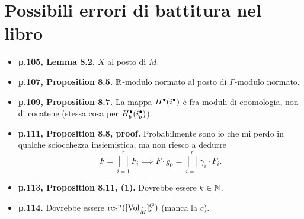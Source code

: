 \section*{Possibili errori di battitura nel libro} 
\begin{itemize}
\item \textbf{p.105, Lemma 8.2.} $X$ al posto di $M$.
\item \textbf{p.107, Proposition 8.5.} $\mathbb{R}$-modulo normato al posto di $\Gamma$-modulo normato.
\item \textbf{p.109, Proposition 8.7.} La mappa $H^\bullet(i^\bullet)$ è fra moduli di coomologia, non di cocatene (stessa cosa per $H^\bullet_b(i^\bullet_b)$).
\item \textbf{p.111, Proposition 8.8, proof.} Probabilmente sono io che mi perdo in qualche sciocchezza insiemistica, ma non riesco a dedurre
\[
F=\bigsqcup_{i=1}^r F_i\implies F\cdot g_0=\bigsqcup_{i=1}^r \gamma_i\cdot F_i.
\]
\item \textbf{p.113, Proposition 8.11, (1).} Dovrebbe essere $k\in\mathbb{N}$.
\item \textbf{p.114.} Dovrebbe essere $\operatorname{res}^n([\operatorname{Vol}_{\widetilde M}]^G_c)$ (manca la $c$).
\end{itemize}
